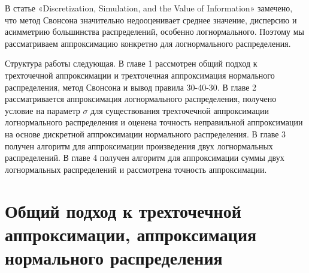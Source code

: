 \documentclass[specialist, substylefile = spbu.rtx,
subf,href,colorlinks=true, 12pt]{disser}
\begin{document}
	В статье «Discretization, Simulation, and the Value of Information» \cite{Simulation} замечено, что метод Свонсона значительно недооценивает среднее значение, дисперсию и асимметрию большинства распределений, особенно логнормального. Поэтому мы рассматриваем аппроксимацию конкретно для логнормального распределения.
	
	Структура работы следующая. В главе 1 рассмотрен общий подход к трехточечной аппроксимации и трехточечная аппроксимация нормального распределения, метод Свонсона и вывод правила 30-40-30. В главе 2 рассматривается аппроксимация логнормального распределения, получено условие на параметр $\sigma$ для существования трехточечной аппроксимации логнормального распределения и оценена точность неправильной аппроксимации на основе дискретной аппроксимации нормального распределения. В главе 3 получен алгоритм для аппроксимации произведения двух логнормальных распределений. В главе 4 получен алгоритм для аппроксимации суммы двух логнормальных распределений и рассмотрена точность аппроксимации.
	
	\chapter{Общий подход к трехточечной аппроксимации, аппроксимация нормального распределения}
	
\end{document}
